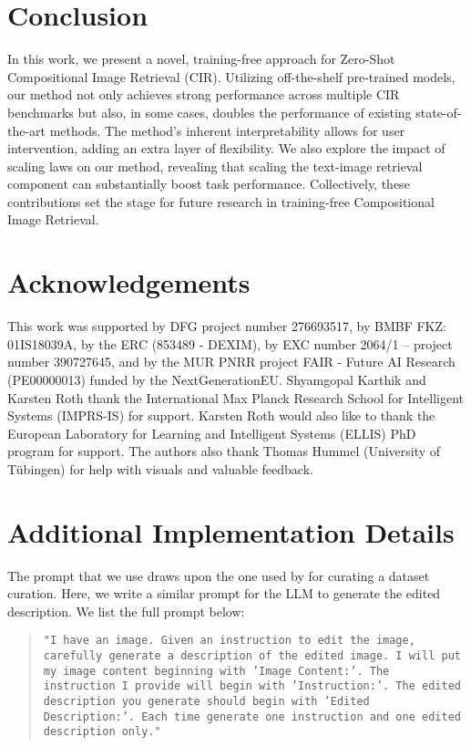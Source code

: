 \documentclass{article} \usepackage{iclr2024_conference,times}
\begin{document}
\section{Conclusion}
In this work, we present a novel, training-free approach for Zero-Shot Compositional Image Retrieval (CIR). Utilizing off-the-shelf pre-trained models, our method not only achieves strong performance across multiple CIR benchmarks but also, in some cases, doubles the performance of existing state-of-the-art methods. The method's inherent interpretability allows for user intervention, adding an extra layer of flexibility. We also explore the impact of scaling laws on our method, revealing that scaling the text-image retrieval component can substantially boost task performance. Collectively, these contributions set the stage for future research in training-free Compositional Image Retrieval.

\section*{Acknowledgements}
This work was supported by DFG project number 276693517, by BMBF FKZ: 01IS18039A, by the ERC (853489 - DEXIM), by EXC number 2064/1 – project number 390727645, and by the MUR PNRR project FAIR - Future AI Research (PE00000013) funded by the NextGenerationEU. Shyamgopal Karthik and Karsten Roth thank the International Max Planck Research School for Intelligent Systems (IMPRS-IS) for support. Karsten Roth would also like to thank the European Laboratory for Learning and Intelligent Systems (ELLIS) PhD program for support. The authors also thank Thomas Hummel (University of Tübingen) for help with visuals and valuable feedback.




\newpage
\appendix

\section{Additional Implementation Details}
\label{sec:app-implementation}
The prompt that we use draws upon the one used by \cite{liu2023zeroshot} for curating a dataset curation. Here, we write a similar prompt for the LLM to generate the edited description. We list the full prompt below:
\begin{quote}
    \small\texttt{"I have an image. Given an instruction to edit the image, carefully generate a description of the 
edited image. I will put my image content beginning with  'Image Content:'. The instruction I provide will begin with 'Instruction:'. 
The edited description you generate should begin with 'Edited Description:'. Each time generate one instruction and one edited description only."}    
\end{quote}
\end{document}
